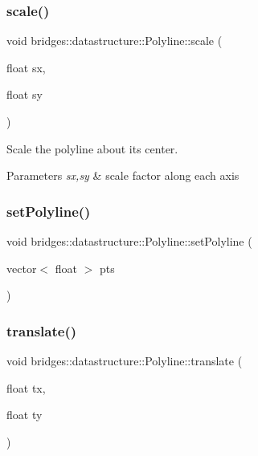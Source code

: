 \subsubsection{\texorpdfstring{scale()}{scale()}}
{\footnotesize\ttfamily void bridges\+::datastructure\+::\+Polyline\+::scale (\begin{DoxyParamCaption}\item[{float}]{sx,  }\item[{float}]{sy }\end{DoxyParamCaption})\hspace{0.3cm}{\ttfamily [inline]}}



Scale the polyline about its center. 


\begin{DoxyParams}{Parameters}
{\em sx,sy} & scale factor along each axis \\
\hline
\end{DoxyParams}
\mbox{\label{classbridges_1_1datastructure_1_1_polyline_ab1fb850dabd3ed58fd4f916992a0b9a6}} 
\subsubsection{\texorpdfstring{set\+Polyline()}{setPolyline()}}
{\footnotesize\ttfamily void bridges\+::datastructure\+::\+Polyline\+::set\+Polyline (\begin{DoxyParamCaption}\item[{vector$<$ float $>$}]{pts }\end{DoxyParamCaption})\hspace{0.3cm}{\ttfamily [inline]}}

\mbox{\label{classbridges_1_1datastructure_1_1_polyline_a0b651b1c383b228f8d473232e64e4bda}} 
\subsubsection{\texorpdfstring{translate()}{translate()}}
{\footnotesize\ttfamily void bridges\+::datastructure\+::\+Polyline\+::translate (\begin{DoxyParamCaption}\item[{float}]{tx,  }\item[{float}]{ty }\end{DoxyParamCaption})\hspace{0.3cm}{\ttfamily [inline]}}



